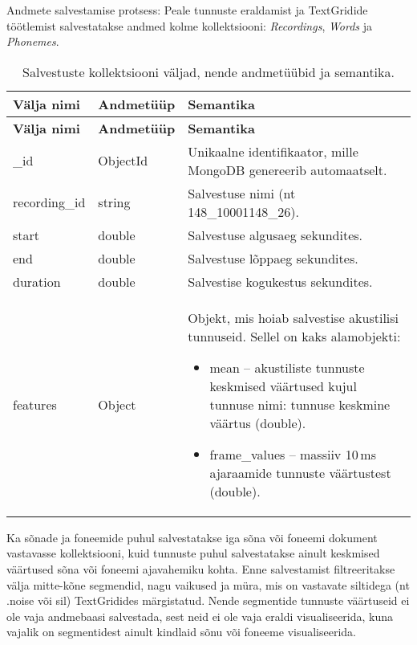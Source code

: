 Andmete salvestamise protsess:
Peale tunnuste eraldamist ja  TextGridide töötlemist salvestatakse andmed kolme kollektsiooni: \textit{Recordings}, \textit{Words} ja \textit{Phonemes}.

\begin{longtable}{|p{2.5cm}|p{3cm}|p{8cm}|}
    \caption{Salvestuste kollektsiooni väljad, nende andmetüübid ja semantika.}
    \label{tab:recordings}\\
    \hline
    \textbf{Välja nimi} & \textbf{Andmetüüp} & \textbf{Semantika}\\
    \hline
    \endfirsthead
    \hline
    \textbf{Välja nimi} & \textbf{Andmetüüp} & \textbf{Semantika}\\
    \hline
    \endhead
    \endfoot
    \hline
    \endlastfoot

    \_id &
    ObjectId &
    Unikaalne identifikaator, mille MongoDB genereerib automaatselt.\\ \hline
  
    recording\_id &
    string &
    Salvestuse nimi (nt 148\_10001148\_26).\\ \hline
          
    start &
    double &
    Salvestuse algusaeg sekundites.\\ \hline
    
    end &
    double &
    Salvestuse lõppaeg sekundites.\\ \hline
    
    duration &
    double &
    Salvestise kogukestus sekundites.\\ \hline

    features &
    Object &
    Objekt, mis hoiab salvestise akustilisi tunnuseid. Sellel on kaks alamobjekti:
    \begin{itemize}
      \item mean – akustiliste tunnuste keskmised väärtused kujul tunnuse nimi: tunnuse keskmine väärtus (double).
      \item frame\_values – massiiv 10\,ms ajaraamide tunnuste väärtustest (double).
    \end{itemize}\\ \hline
\end{longtable}

Ka sõnade ja foneemide puhul salvestatakse iga sõna või foneemi dokument vastavasse kollektsiooni, kuid tunnuste puhul salvestatakse ainult keskmised väärtused sõna või foneemi ajavahemiku kohta. Enne salvestamist filtreeritakse välja mitte-kõne segmendid, nagu vaikused ja müra, mis on vastavate siltidega (nt .noise või sil) TextGridides märgistatud. Nende segmentide tunnuste väärtuseid ei ole vaja andmebaasi salvestada, sest neid ei ole vaja eraldi visualiseerida, kuna vajalik on segmentidest ainult kindlaid sõnu või foneeme visualiseerida.


